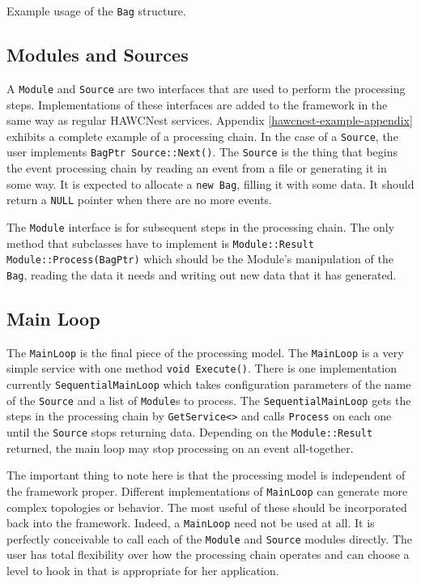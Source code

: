 \documentclass[12pt]{article}
\begin{document}
\begin{example}

\caption{Example usage of the {\tt Bag} structure.}
\label{bagexample}
\end{example}


\subsection{Modules and Sources}

A {\tt Module} and {\tt Source} are two interfaces that are used to perform the
processing steps.  Implementations of these interfaces are added
to the framework in the same way as regular HAWCNest services.  Appendix
\ref{hawcnest-example-appendix}
exhibits a complete example of a processing chain. In the case of a 
{\tt Source}, the user implements {\tt BagPtr Source::Next()}. The 
{\tt Source} is the thing that begins the event processing chain by reading
an event from a file or generating it in some way.  It is expected to allocate
a {\tt new Bag}, filling it with some data.  It should return a {\tt NULL} 
pointer when there are no more events.

The {\tt Module} interface is for subsequent steps in the processing chain.
The only method that subclasses have to implement is 
{\tt Module::Result Module::Process(BagPtr)} which should be the Module's 
manipulation of the {\tt Bag}, reading the data it needs and writing out new
data that it has generated.

\subsection{Main Loop}

The {\tt MainLoop} is the final piece of the processing model.  The 
{\tt MainLoop} is a very simple service with one method {\tt void Execute()}.
There is one implementation currently {\tt SequentialMainLoop} which
takes configuration parameters of the name of the {\tt Source} and a list 
of {\tt Module}s to process.  The {\tt SequentialMainLoop} gets the 
steps in the processing chain by 
{\tt GetService<>} and calls
{\tt Process} on each one until the {\tt Source} stops returning data. 
Depending on the {\tt Module::Result} returned, the main loop may stop 
processing on an event all-together.

The important thing to note here is that the processing model is independent
of the framework proper. Different implementations of {\tt MainLoop} can
generate more complex topologies or behavior. The most useful of these should
be incorporated back into the framework. Indeed, a {\tt MainLoop} need not
be used at all. It is perfectly conceivable to call each of the {\tt Module}
and {\tt Source} modules directly. The user has total flexibility over how
the processing chain operates and can choose a level to hook in that is 
appropriate for her application.
\end{document}
